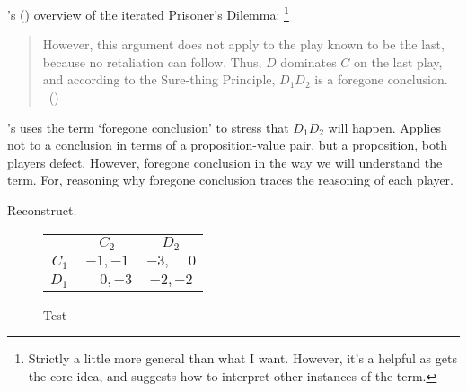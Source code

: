 \begin{note}
  \citeauthor{Rapoport:1989ww}'s (\citeyear{Rapoport:1989ww}) overview of the iterated Prisoner's Dilemma:%
  \footnote{
    Strictly a little more general than what I want.
    However, it's a helpful  as gets the core idea, and suggests how to interpret other instances of the term.
  }

  \begin{quote}
    However, this argument does not apply to the play known to be the last, because no retaliation can follow.
    Thus, \(D\) dominates \(C\) on the last play, and according to the Sure-thing Principle, \(D_{1}D_{2}\) is a foregone conclusion.%
    \mbox{ }\hfill\mbox{(\citeyear[202]{Rapoport:1989ww})}
  \end{quote}

  \citeauthor{Rapoport:1989ww}'s uses the term `foregone conclusion' to stress that \(D_{1}D_{2}\) will happen.
  Applies not to a conclusion in terms of a proposition-value pair, but a proposition, both players defect.
  However, foregone conclusion in the way we will understand the term.
  For, reasoning why foregone conclusion traces the reasoning of each player.

  Reconstruct.


  \begin{figure}[H]
    \centering
    \begin{tabular}{r|c|c|}
      \multicolumn{1}{c}{} & \multicolumn{1}{c}{\(C_{2}\)} & \multicolumn{1}{c}{\(D_{2}\)} \\
      \cline{2-3}
      \(C_{1}\) & \(-1,-1\) & \(-3,\phantom{-}0\)\\
      \cline{2-3}
      \(D_{1}\) & \(\phantom{-}0,-3\) & \(-2,-2\)\\
      \cline{2-3}
    \end{tabular}
    \caption{Test}
    \label{fig:PD:matrix}
  \end{figure}


\end{note}
